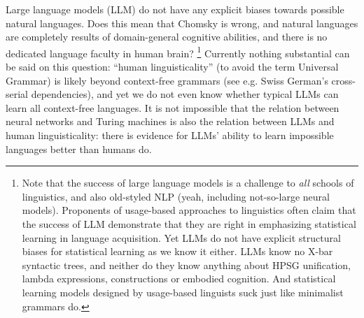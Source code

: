 \documentclass[hyperref, a4paper, 12pt]{report}
\begin{document}
Large language models (LLM) do not have any explicit biases towards possible natural languages.
Does this mean that Chomsky is wrong,
and natural languages are completely results of domain-general cognitive abilities,
and there is no dedicated language faculty in human brain?%
\footnote{
    Note that the success of large language models is a challenge to \emph{all} schools of linguistics,
    and also old-styled NLP (yeah, including not-so-large neural models).
    Proponents of usage-based approaches to linguistics often claim that the success of LLM 
    demonstrate that they are right in emphasizing statistical learning in language acquisition.
    Yet LLMs do not have explicit structural biases for statistical learning as we know it either.
    LLMs know no X-bar syntactic trees, and neither do they know anything about HPSG unification, lambda expressions, constructions or embodied cognition.
    And statistical learning models designed by usage-based linguists suck
    just like minimalist grammars do.
}
Currently nothing substantial can be said on this question:
``human linguisticality'' (to avoid the term Universal Grammar) is likely beyond context-free grammars (see e.g. Swiss German's cross-serial dependencies),
and yet we do not even know whether typical LLMs can learn all context-free languages.
It is not impossible that the relation between neural networks and Turing machines
is also the relation between LLMs and human linguisticality:
there is evidence for LLMs' ability to learn impossible languages better than humans do.%
\end{document}
